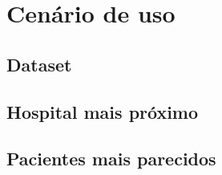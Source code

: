 \section{Cenário de uso}

    \subsection{Dataset}

    \subsection{Hospital mais próximo}

    \subsection{Pacientes mais parecidos}
